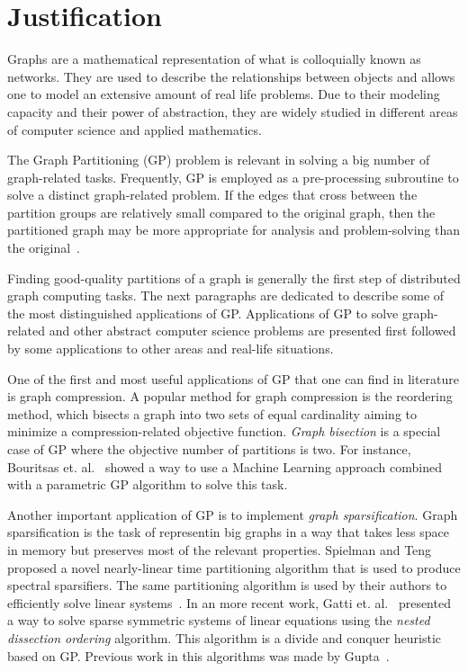 \section{Justification}

Graphs are a mathematical representation of what is colloquially known as networks. They are used to describe the relationships between objects and allows one to model an extensive amount of real life problems. Due to their modeling capacity and their power of abstraction, they are widely studied in different areas of computer science and applied mathematics.

The Graph Partitioning (GP) problem is relevant in solving a big number of graph-related tasks. Frequently, GP is employed as a pre-processing subroutine to solve a distinct graph-related problem. If the edges that cross between the partition groups are relatively small compared to the original graph, then the partitioned graph may be more appropriate for analysis and problem-solving than the original~\cite{bettersuited}. 

Finding good-quality partitions of a graph is generally the first step of distributed graph computing tasks. The next paragraphs are dedicated to describe some of the most distinguished applications of GP. Applications of GP to solve graph-related and other abstract computer science problems are presented first followed by some applications to other areas and real-life situations.

One of the first and most useful applications of GP that one can find in literature is graph compression. A popular method for graph compression is the reordering method, which bisects a graph into two sets of equal cardinality aiming to minimize a compression-related objective function. \textit{Graph bisection} is a special case of GP where the objective number of partitions is two. For instance, Bouritsas et. al.~\cite{compressgraphs} showed a way to use a Machine Learning approach combined with a parametric GP algorithm to solve this task.

Another important application of GP is to implement \textit{graph sparsification}. Graph sparsification is the task of representin big graphs in a way that takes less space in memory but preserves most of the relevant properties. Spielman and Teng~\cite{sparsification} proposed a novel nearly-linear time partitioning algorithm that is used to produce spectral sparsifiers. The same partitioning algorithm is used by their authors to efficiently solve linear systems~\cite{linearsystems}. In an more recent work, Gatti et. al.~\cite{nesteddissection} presented a way to solve sparse symmetric systems of linear equations using the \textit{nested dissection ordering} algorithm. This algorithm is a divide and conquer heuristic based on GP. Previous work in this algorithms was made by Gupta~\cite{matrixordering}.

